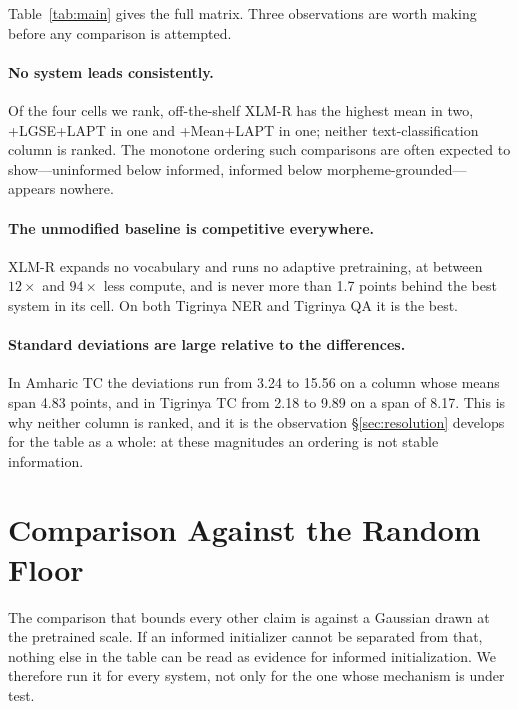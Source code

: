 \documentclass[11pt]{article}
\begin{document}
Table~\ref{tab:main} gives the full matrix. Three observations are worth
making before any comparison is attempted.

\paragraph{No system leads consistently.} Of the four cells we rank,
off-the-shelf XLM-R has the highest mean in two, +LGSE+LAPT in one and
+Mean+LAPT in one; neither text-classification column is ranked. The monotone
ordering such comparisons are often expected to show---uninformed below
informed, informed below morpheme-grounded---appears nowhere.

\paragraph{The unmodified baseline is competitive everywhere.} XLM-R expands
no vocabulary and runs no adaptive pretraining, at between $12\times$ and
$94\times$ less compute, and is never more than 1.7 points behind the best
system in its cell. On both Tigrinya NER and Tigrinya QA it is the best.

\paragraph{Standard deviations are large relative to the differences.}
In Amharic TC the deviations run from 3.24 to 15.56 on a column whose means
span 4.83 points, and in Tigrinya TC from 2.18 to 9.89 on a span of 8.17.
This is why neither column is ranked, and it is the observation
\S\ref{sec:resolution} develops for the table as a whole: at these magnitudes
an ordering is not stable information.

\section{Comparison Against the Random Floor}
\label{sec:floor}

The comparison that bounds every other claim is against a Gaussian drawn at
the pretrained scale. If an informed initializer cannot be separated from
that, nothing else in the table can be read as evidence for informed
initialization. We therefore run it for every system, not only for the one
whose mechanism is under test.
\end{document}
